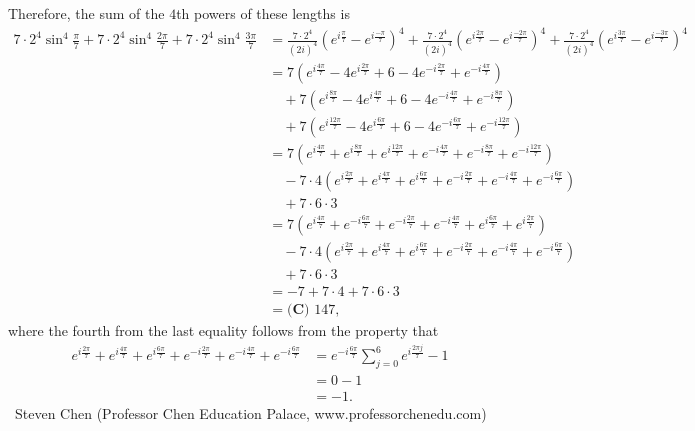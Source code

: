 \begin{enumerate}
 Therefore, the sum of the $4$th powers of these lengths is
 \begin{align*} 7 \cdot 2^4 \sin^4 \frac{\pi}{7} + 7 \cdot 2^4 \sin^4 \frac{2 \pi}{7} + 7 \cdot 2^4 \sin^4 \frac{3 \pi}{7} & = \frac{7 \cdot 2^4}{(2i)^4} \left( e^{i \frac{\pi}{7}} - e^{i \frac{-\pi}{7}} \right)^4 + \frac{7 \cdot 2^4}{(2i)^4} \left( e^{i \frac{2 \pi}{7}} - e^{i \frac{-2 \pi}{7}} \right)^4 + \frac{7 \cdot 2^4}{(2i)^4} \left( e^{i \frac{3 \pi}{7}} - e^{i \frac{-3 \pi}{7}} \right)^4 \\ & = 7 \left( e^{i \frac{4 \pi}{7}} - 4 e^{i \frac{2 \pi}{7}} + 6 - 4 e^{- i \frac{2 \pi}{7}} + e^{- i \frac{4 \pi}{7}} \right) \\ & \quad + 7 \left( e^{i \frac{8 \pi}{7}} - 4 e^{i \frac{4 \pi}{7}} + 6 - 4 e^{- i \frac{4 \pi}{7}} + e^{- i \frac{8 \pi}{7}} \right) \\ & \quad + 7 \left( e^{i \frac{12 \pi}{7}} - 4 e^{i \frac{6 \pi}{7}} + 6 - 4 e^{- i \frac{6 \pi}{7}} + e^{- i \frac{12 \pi}{7}} \right) \\ & = 7 \left( e^{i \frac{4 \pi}{7}} + e^{i \frac{8 \pi}{7}} + e^{i \frac{12 \pi}{7}} + e^{-i \frac{4 \pi}{7}} + e^{-i \frac{8 \pi}{7}} + e^{-i \frac{12 \pi}{7}} \right) \\ & \quad - 7 \cdot 4 \left( e^{i \frac{2 \pi}{7}} + e^{i \frac{4 \pi}{7}} + e^{i \frac{6 \pi}{7}} + e^{-i \frac{2 \pi}{7}} + e^{-i \frac{4 \pi}{7}} + e^{-i \frac{6 \pi}{7}} \right) \\ & \quad + 7 \cdot 6 \cdot 3 \\ & = 7 \left( e^{i \frac{4 \pi}{7}} + e^{-i \frac{6 \pi}{7}} + e^{-i \frac{2 \pi}{7}} + e^{-i \frac{4 \pi}{7}} + e^{i \frac{6 \pi}{7}} + e^{i \frac{2 \pi}{7}} \right) \\ & \quad - 7 \cdot 4 \left( e^{i \frac{2 \pi}{7}} + e^{i \frac{4 \pi}{7}} + e^{i \frac{6 \pi}{7}} + e^{-i \frac{2 \pi}{7}} + e^{-i \frac{4 \pi}{7}} + e^{-i \frac{6 \pi}{7}} \right) \\ & \quad + 7 \cdot 6 \cdot 3 \\ & = -7 + 7 \cdot 4 + 7 \cdot 6 \cdot 3 \\ & = \boxed{\textbf{(C) }147}, \end{align*}
where the fourth from the last equality follows from the property that
 \begin{align*} e^{i \frac{2 \pi}{7}} + e^{i \frac{4 \pi}{7}} + e^{i \frac{6 \pi}{7}} + e^{-i \frac{2 \pi}{7}} + e^{-i \frac{4 \pi}{7}} + e^{-i \frac{6 \pi}{7}} & = e^{-i \frac{6 \pi}{7}} \sum_{j=0}^6 e^{i \frac{2 \pi j}{7}} - 1  \\ & = 0 - 1 \\ & = -1 . \end{align*}
~Steven Chen (Professor Chen Education Palace, www.professorchenedu.com)


\end{enumerate}
